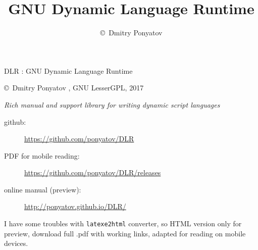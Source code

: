 

\title{GNU Dynamic Language Runtime}
\author{\copyright\ Dmitry Ponyatov }


\maketitle

{\Large DLR : GNU Dynamic Language Runtime}

\bigskip
\copyright\ Dmitry Ponyatov  , GNU LesserGPL, 2017

\bigskip
\emph{Rich manual and support library for writing dynamic script languages}  
\bigskip

\begin{description}
\item[github:] \url{https://github.com/ponyatov/DLR}
\item[PDF for mobile reading:] \url{https://github.com/ponyatov/DLR/releases}
\item[online manual (preview):] \url{http://ponyatov.github.io/DLR/}
\end{description}

\noindent
I have some troubles with \verb|latexe2html| converter, so HTML version only for
preview, download full .pdf with working links, adapted for reading on mobile
devices.

\tableofcontents











